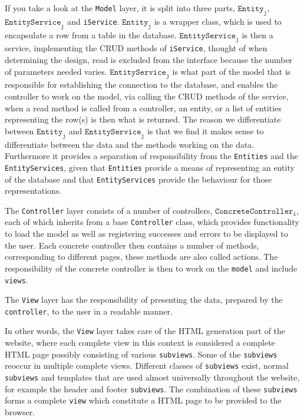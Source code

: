 \begin{description}[style=nextline]
	\item[Model Layer] 
	If you take a look at the \texttt{Model} layer, it is split into three parts, $\texttt{Entity}_\texttt{j}$, $\texttt{EntityService}_\texttt{j}$ and \texttt{iService}.
	$\texttt{Entity}_\texttt{j}$ is a wrapper class, which is used to encapsulate a row from a table in the database.
	$\texttt{EntityService}_\texttt{j}$ is then a service, implementing the CRUD methods of \texttt{iService}, thought of when determining the design, read is excluded from the interface because the number of parameters needed varies.
	$\texttt{EntityService}_\texttt{j}$ is what part of the model that is responsible for establishing the connection to the database, and enables the controller to work on the model, via calling the CRUD methods of the service, when a read method is called from a controller, an entity, or a list of entities representing the row(s) is then what is returned.
	The reason we differentiate between  $\texttt{Entity}_\texttt{j}$ and $\texttt{EntityService}_\texttt{j}$ is that we find it makes sense to differentiate between the data and the methods working on the data.
    Furthermore it provides a separation of responsibility from the \texttt{Entities} and the \texttt{EntityServices}, given that \texttt{Entities} provide a means of representing an entity of the database and that \texttt{EntityServices} provide the behaviour for those representations.
	
	\item[Controller Layer]
	The \texttt{Controller} layer consists of a number of controllers, $\texttt{ConcreteController}_\texttt{i}$, each of which inherits from a base \texttt{Controller} class, which provides functionality to load the model as well as registering successes and errors to be displayed to the user.
	Each concrete controller then contains a number of methods, corresponding to different pages, these methods are also called actions. 
    The responsibility of the concrete controller is then to work on the \texttt{model} and include \texttt{views}. 
	
	\item[View Layer]
	The \texttt{View} layer has the responsibility of presenting the data, prepared by the \texttt{controller}, to the user in a readable manner.
	
	In other words, the \texttt{View} layer takes care of the HTML generation part of the website, where each complete view in this context is considered a complete HTML page possibly consisting of various \texttt{subviews}.
	Some of the \texttt{subviews} reoccur in multiple complete views.
    Different classes of \texttt{subviews} exist, normal \texttt{subviews} and templates that are used almost universally throughout the website, for example the header and footer \texttt{subviews}.
	The combination of these \texttt{subviews} forms a complete \texttt{view} which constitute a HTML page to be provided to the browser.
	

\end{description}
